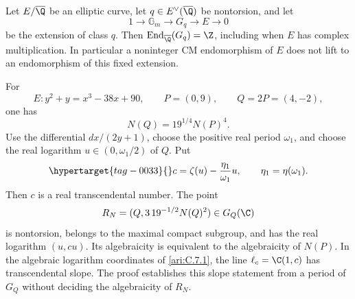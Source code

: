\begin{proposition}\hypertarget{tag-001I}{}\label{ari:C.7.9}

Let $E/\overline\Q$ be an elliptic curve, let
$q\in E^\vee(\overline\Q)$ be nontorsion, and let
\[
 1\longrightarrow\mathbb G_m\longrightarrow G_q
       \longrightarrow E\longrightarrow0
\]
be the extension of class $q$. Then
$\operatorname{End}_{\overline\Q}(G_q)=\Z$, including when
$E$ has complex multiplication. In particular a noninteger
CM endomorphism of $E$ does not lift to an endomorphism of this
fixed extension.

For
\[
 E:y^2+y=x^3-38x+90,\qquad P=(0,9),\qquad Q=2P=(4,-2),
\]
one has
\[
 N(Q)=19^{1/4}N(P)^4.
\]
Use the differential $dx/(2y+1)$, choose the positive real
period $\omega_1$, and choose the real logarithm
$u\in(0,\omega_1/2)$ of $Q$. Put
\begin{equation}\hypertarget{tag-0033}{}\label{ari:eq:cd-slope}
 c=\zeta(u)-\frac{\eta_1}{\omega_1}u,
 \qquad \eta_1=\eta(\omega_1).
\end{equation}
Then $c$ is a real transcendental number. The point
\[
 R_N=(Q,3\,19^{-1/2}N(Q)^2)\in G_Q(\C)
\]
is nontorsion, belongs to the maximal compact subgroup, and has
the real logarithm $(u,cu)$. Its algebraicity is equivalent to
the algebraicity of $N(P)$. In the algebraic logarithm coordinates
of \ref{ari:C.7.1}, the line $\ell_c=\C(1,c)$ has transcendental
slope. The proof establishes this slope statement from a period
of $G_Q$ without deciding the algebraicity of $R_N$.
\end{proposition}


